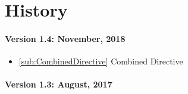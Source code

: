 \section*{History}

\paragraph*{Version 1.4: November, 2018}
\begin{itemize}
  \item \ref{sub:CombinedDirective}      Combined Directive
\end{itemize}

\paragraph*{Version 1.3: August, 2017}

